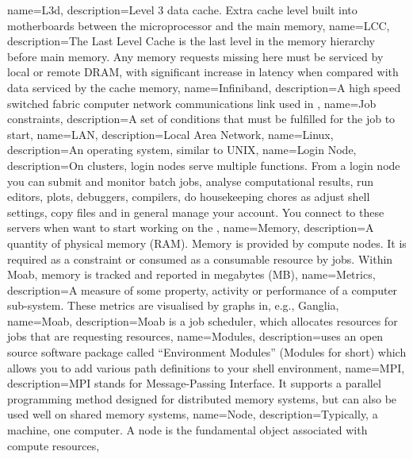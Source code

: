 {
  name={L3d},
  description={Level 3 data cache. Extra cache level built into motherboards between the microprocessor and the main memory},
}
{
  name={LCC},
  description={The Last Level Cache is the last level in the memory hierarchy before main memory. Any memory requests missing here must be serviced by local or remote DRAM, with significant increase in latency when compared with data serviced by the cache memory},
}
{
  name={Infiniband},
  description={A high speed switched fabric computer network communications link used in \hpc},
}
{
  name={Job constraints},
  description={A set of conditions that must be fulfilled for the job to start},
}
{
  name={LAN},
  description={Local Area Network},
}
{
  name={Linux},
  description={An operating system, similar to UNIX},
}
{
  name={Login Node},
  description={On \hpc clusters, login nodes serve multiple functions. From a login node you can submit and monitor batch jobs, analyse computational results, run editors, plots, debuggers, compilers, do housekeeping chores as adjust shell settings, copy files and in general manage your account. You connect to these servers when want to start working on the \hpcInfra},
}
{
  name={Memory},
  description={A quantity of physical memory (RAM). Memory is provided by compute nodes. It is required as a constraint or consumed as a consumable resource by jobs. Within Moab, memory is tracked and reported in megabytes (MB)},
}
{
  name={Metrics},
  description={A measure of some property, activity or performance of a computer sub-system. These metrics are visualised by graphs in, e.g., Ganglia},
}
{
  name={Moab},
  description={Moab is a job scheduler, which allocates resources for jobs that are requesting resources},
}
{
  name={Modules},
  description={\hpc uses an open source software package called ``Environment Modules'' (Modules for short) which allows you to add various path definitions to your shell environment},
}
{
  name={MPI},
  description={MPI stands for Message-Passing Interface. It supports a parallel programming method designed for distributed memory systems, but can also be used well on shared memory systems},
}
{
  name={Node},
  description={Typically, a machine, one computer. A node is the fundamental object associated with compute resources},
}
